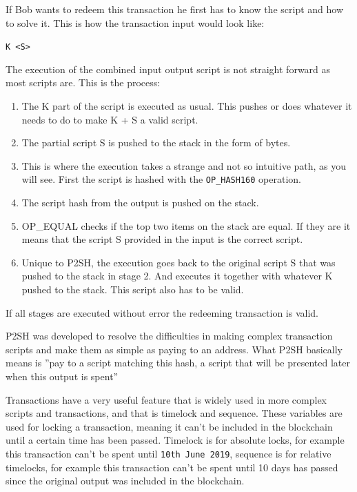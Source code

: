 If Bob wants to redeem this transaction he first has to know the script and how to solve it. This is how the transaction input would look like: 

\texttt{K <S>}

The execution of the combined input output script is not straight forward as most scripts are. This is the process:
\begin{enumerate}
	\item The K part of the script is executed as usual. This pushes or does whatever it needs to do to make K + S a valid script.
	\item The partial script S is pushed to the stack in the form of bytes.
	\item This is where the execution takes a strange and not so intuitive path, as you will see. First the script is hashed with the \texttt{OP\_HASH160} operation.
	\item The script hash from the output is pushed on the stack.
	\item OP\_EQUAL checks if the top two items on the stack are equal. If they are it means that the script S provided in the input is the correct script.
	\item Unique to P2SH, the execution goes back to the original script S that was pushed to the stack in stage 2. And executes it together with whatever K pushed to the stack. This script also has to be valid.\cite{scripthash} 
\end{enumerate}

If all stages are executed without error the redeeming transaction is valid. 

P2SH was developed to resolve the difficulties in making complex transaction scripts and make them as simple as paying to an address. What P2SH basically means is ''pay to a script matching this hash, a script that will be presented later when this output is spent''\cite{antonopoulos_2017}\cite{scripthash}

Transactions have a very useful feature that is widely used in more complex scripts and transactions, and that is timelock and sequence. These variables are used for locking a transaction, meaning it can't be included in the blockchain until a certain time has been passed. Timelock is for absolute locks, for example this transaction can't be spent until \texttt{10th June 2019}, sequence is for relative timelocks, for example this transaction can't be spent until 10 days has passed since the original output was included in the blockchain.

